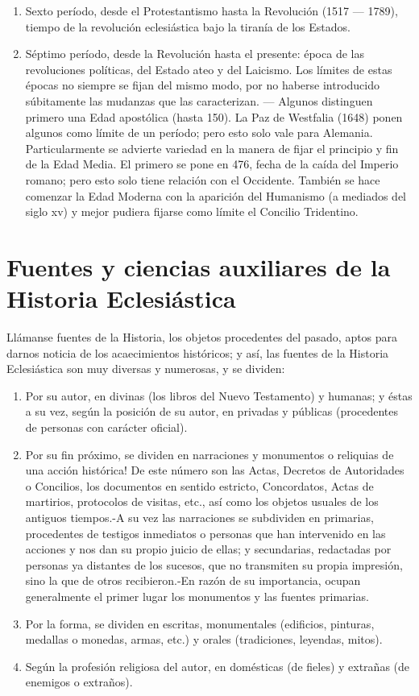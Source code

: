 \raggedbottom{} \documentclass[12pt, a4paper]{book}
\begin{document}
\begin{enumerate}
\begin{enumerate}
          \item Sexto período, desde el Protestantismo hasta la Revolución (1517 --- 1789), tiempo de la revolución eclesiástica bajo la tiranía de los Estados.
          \item Séptimo período, desde la Revolución hasta el presente: época de las revoluciones políticas, del Estado ateo y del Laicismo. Los límites de estas épocas no siempre se fijan del mismo modo, por no haberse introducido súbitamente las mudanzas que las caracterizan. --- Algunos distinguen primero una Edad apostólica (hasta 150). La Paz de Westfalia (1648) ponen algunos como límite de un período; pero esto solo vale para Alemania. Particularmente se advierte variedad en la manera de fijar el principio y fin de la Edad Media. El primero se pone en 476, fecha de la caída del Imperio romano; pero esto solo tiene relación con el Occidente. También se hace comenzar la Edad Moderna con la aparición del Humanismo (a mediados del siglo xv) y mejor pudiera fijarse como límite el Concilio Tridentino.
        \end{enumerate}

\end{enumerate}
\section{Fuentes y ciencias auxiliares de la Historia Eclesiástica}
Llámanse fuentes de la Historia, los objetos procedentes del pasado, aptos para darnos noticia de los acaecimientos históricos; y
así, las fuentes de la Historia Eclesiástica son muy diversas y numerosas, y se dividen:
\begin{enumerate}
  \item Por su autor, en divinas (los libros del Nuevo Testamento) y humanas; y éstas a su vez, según la posición de su autor, en privadas y públicas (procedentes de personas con carácter oficial).
  \item Por su fin próximo, se dividen en narraciones y monumentos o reliquias de una acción histórica! De este número son las Actas, Decretos de Autoridades o Concilios, los documentos en sentido estricto, Concordatos, Actas de martirios, protocolos de visitas, etc., así como los objetos usuales de los antiguos tiempos.-A su vez las narraciones se subdividen en primarias, procedentes de testigos inmediatos o personas que han intervenido en las acciones y nos dan su propio juicio de ellas; y secundarias, redactadas por personas ya distantes de los sucesos, que no transmiten su propia impresión, sino la que de otros recibieron.-En razón de su importancia, ocupan generalmente el primer lugar los monumentos y las fuentes primarias.
  \item Por la forma, se dividen en escritas, monumentales (edificios, pinturas, medallas o monedas, armas, etc.) y orales (tradiciones, leyendas, mitos).
  \item Según la profesión religiosa del autor, en domésticas (de fieles) y extrañas (de enemigos o extraños).
\end{enumerate}
\end{document}
